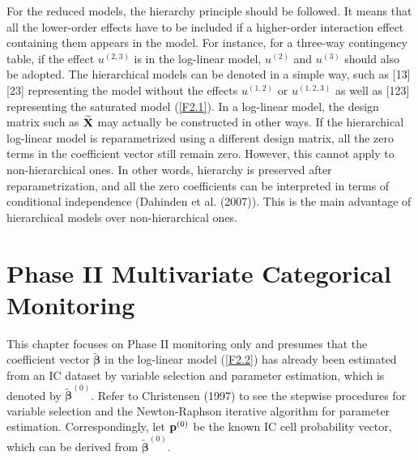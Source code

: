 For the reduced models, the hierarchy principle should be followed. It means that
all the lower-order effects have to be included if a higher-order interaction effect
containing them appears in the model. For instance, for a three-way contingency
table, if the effect $u^{(2,3)}$ is in the log-linear model, $u^{(2)}$ and $u^{(3)}$
should also be adopted. The hierarchical models can be denoted in a simple way, such
as [13][23] representing the model without the effects $u^{(1,2)}$ or $u^{(1,2,3)}$
as well as [123] representing the saturated model (\ref{F2.1}). In a log-linear
model, the design matrix such as $\widetilde{\bf X}$ may actually be constructed in
other ways. If the hierarchical log-linear model is reparametrized using a different
design matrix, all the zero terms in the coefficient vector still remain zero.
However, this cannot apply to non-hierarchical ones. In other words, hierarchy is
preserved after reparametrization, and all the zero coefficients can be interpreted
in terms of conditional independence (Dahinden et al. (2007)). This is the main
advantage of hierarchical models over non-hierarchical ones.



\section{Phase II Multivariate Categorical Monitoring}\label{sec2.3}

This chapter focuses on Phase II monitoring only and presumes that the coefficient
vector $\widetilde{\bm\beta}$ in the log-linear model (\ref{F2.2}) has already been
estimated from an IC dataset by variable selection and parameter estimation, which
is denoted by $\widetilde{\bm\beta}^{(0)}$. Refer to Christensen (1997) to see the
stepwise procedures for variable selection and the Newton-Raphson iterative
algorithm for parameter estimation. Correspondingly, let ${\bf p}^{(0)}$ be the
known IC cell probability vector, which can be derived from
$\widetilde{\bm\beta}^{(0)}$.

